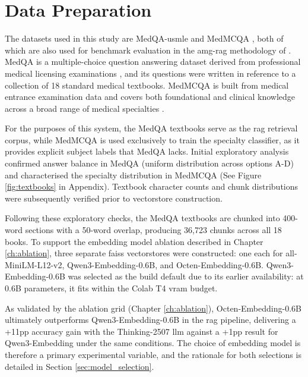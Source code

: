 \chapter{Data Preparation}

The datasets used in this study are MedQA-\gls{usmle} \cite{jin_what_2021} and MedMCQA \cite{pal_medmcqa_2022}, both of which are also used for benchmark evaluation in the \gls{amg-rag} methodology of \citet{rezaei_agentic_2025}. MedQA is a multiple-choice question answering dataset derived from professional medical licensing examinations \cite{jin_what_2021}, and its questions were written in reference to a collection of 18 standard medical textbooks. MedMCQA is built from medical entrance examination data and covers both foundational and clinical knowledge across a broad range of medical specialties \cite{pal_medmcqa_2022}. 

For the purposes of this system, the MedQA textbooks serve as the \gls{rag} retrieval corpus, while MedMCQA is used exclusively to train the specialty classifier, as it provides explicit subject labels that MedQA lacks. Initial exploratory analysis confirmed answer balance in MedQA (uniform distribution across options A-D) and characterised the specialty distribution in MedMCQA (See Figure \ref{fig:textbooks} in Appendix). Textbook character counts and chunk distributions were subsequently verified prior to vectorstore construction.

Following these exploratory checks, the MedQA textbooks are chunked into 400-word sections with a 50-word overlap, producing 36,723 chunks across all 18 books. To support the embedding model ablation described in Chapter \ref{ch:ablation}, three separate \gls{faiss} vectorstores were constructed: one each for all-MiniLM-L12-v2, Qwen3-Embedding-0.6B, and Octen-Embedding-0.6B. Qwen3-Embedding-0.6B was selected as the build default due to its earlier availability: at 0.6B parameters, it fits within the Colab T4 \gls{vram} budget. 

As validated by the ablation grid (Chapter \ref{ch:ablation}), Octen-Embedding-0.6B ultimately outperforms Qwen3-Embedding-0.6B in the \gls{rag} pipeline, delivering a +11\gls{pp} accuracy gain with the Thinking-2507 \gls{llm} against a +1\gls{pp} result for Qwen3-Embedding under the same conditions. The choice of embedding model is therefore a primary experimental variable, and the rationale for both selections is detailed in Section \ref{sec:model_selection}.
